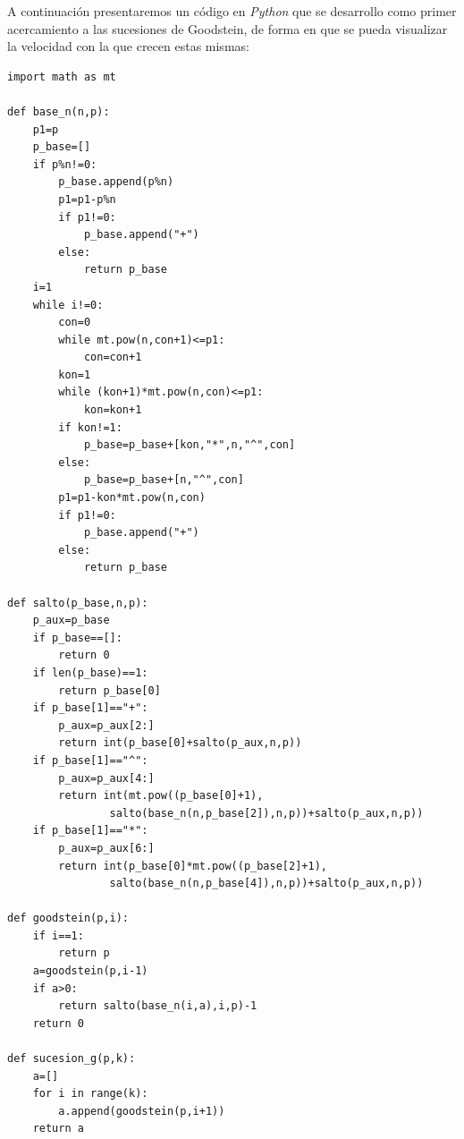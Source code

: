 
A continuación presentaremos un código en \textit{Python} que se desarrollo como primer acercamiento a las sucesiones de Goodstein, de forma en que se pueda visualizar la velocidad con la que crecen estas mismas:

\begin{verbatim}
import math as mt

def base_n(n,p):
    p1=p
    p_base=[]
    if p%n!=0:
        p_base.append(p%n)
        p1=p1-p%n
        if p1!=0:
            p_base.append("+")
        else:
            return p_base
    i=1
    while i!=0:
        con=0
        while mt.pow(n,con+1)<=p1:
            con=con+1
        kon=1
        while (kon+1)*mt.pow(n,con)<=p1:
            kon=kon+1
        if kon!=1:
            p_base=p_base+[kon,"*",n,"^",con]
        else:
            p_base=p_base+[n,"^",con]
        p1=p1-kon*mt.pow(n,con)
        if p1!=0:
            p_base.append("+")
        else:
            return p_base

def salto(p_base,n,p):
    p_aux=p_base
    if p_base==[]:
        return 0
    if len(p_base)==1:
        return p_base[0]
    if p_base[1]=="+":
        p_aux=p_aux[2:]
        return int(p_base[0]+salto(p_aux,n,p))
    if p_base[1]=="^":
        p_aux=p_aux[4:]
        return int(mt.pow((p_base[0]+1),
                salto(base_n(n,p_base[2]),n,p))+salto(p_aux,n,p))
    if p_base[1]=="*":
        p_aux=p_aux[6:]
        return int(p_base[0]*mt.pow((p_base[2]+1),
                salto(base_n(n,p_base[4]),n,p))+salto(p_aux,n,p))

def goodstein(p,i):
    if i==1:
        return p
    a=goodstein(p,i-1)
    if a>0:
        return salto(base_n(i,a),i,p)-1
    return 0

def sucesion_g(p,k):
    a=[]
    for i in range(k):
        a.append(goodstein(p,i+1))
    return a
\end{verbatim}